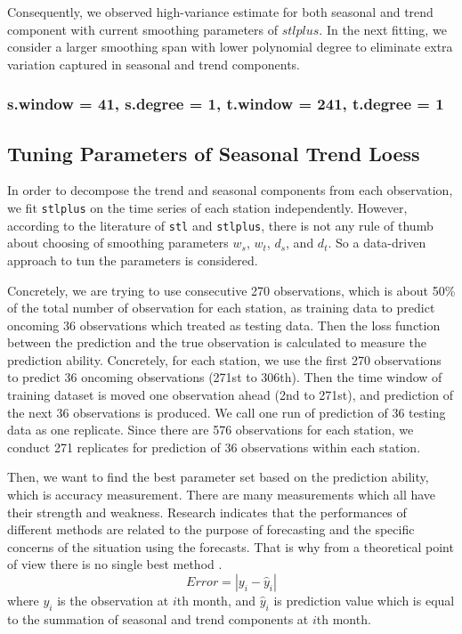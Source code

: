 Consequently, we observed high-variance estimate for both seasonal and trend
component with current smoothing parameters of $stlplus$. In the next fitting, we
consider a larger smoothing span with lower polynomial degree to eliminate extra
variation captured in seasonal and trend components. 

\subsubsection{s.window = 41, s.degree = 1, t.window = 241, t.degree = 1}












\subsection{Tuning Parameters of Seasonal Trend Loess}

In order to decompose the trend and seasonal components from each observation, we 
fit \texttt{stlplus} on the time series of each station independently. However,
according to the literature of \texttt{stl} and \texttt{stlplus}, there is not 
any rule of thumb about choosing of smoothing parameters $w_s$, $w_t$, $d_s$, and 
$d_t$. So a data-driven approach to tun the parameters is considered. 

Concretely, we are trying to use consecutive 270 observations, which is about 
50\% of the total number of observation for each station, as training 
data to predict oncoming 36 observations which treated as testing data. Then the 
loss function between the prediction and the true observation is calculated to 
measure the prediction ability. Concretely, for 
each station, we use the first 270 observations to predict 36 oncoming 
observations (271st to 306th). Then the time window of training dataset is moved 
one observation ahead (2nd to 271st), and prediction of the next 36 observations 
is produced. We call one run of prediction of 36 testing data as one replicate. 
Since there are 576 observations for each station, we conduct 271 replicates for 
prediction of 36 observations within each station.

Then, we want to find the best parameter set based on the prediction ability,
which is accuracy measurement. 
There are many measurements which all have their strength and weakness. 
Research indicates that the performances of different methods are related to the
purpose of forecasting and the specific concerns of the situation using the 
forecasts. 
That is why from a theoretical point of view there is no single best method 
\cite{brockwell2002introduction}.
$$
Error = | y_i - \hat y_i |
$$
where $y_i$ is the observation at $i$th month, and $\hat y_i$ is prediction value
which is equal to the summation of seasonal and trend components at $i$th month.

